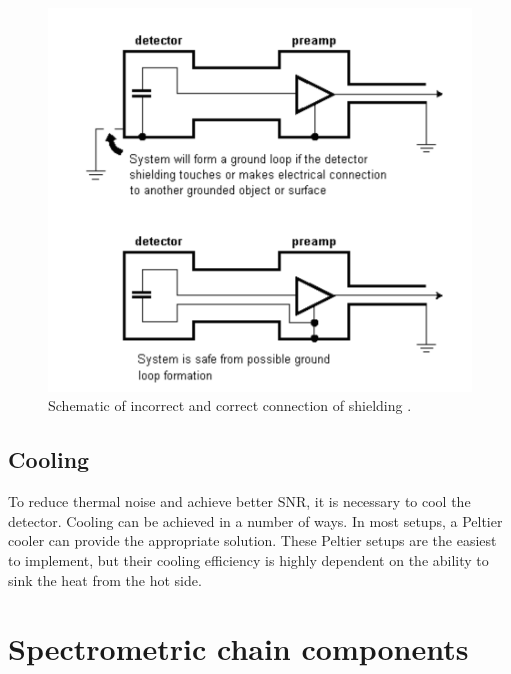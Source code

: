 \begin{figure}[H]
 \centering
 \includegraphics[scale=0.35, angle = 0]{./pictures/shielding.png}
 \caption{Schematic of incorrect and correct connection of shielding \cite{appCSPnote}.}
 \label{shielding}
 
\end{figure}



\subsection{Cooling}
To reduce thermal noise and achieve better SNR, it is necessary to cool the detector. Cooling can be achieved in a number of ways. In most setups, a Peltier cooler can provide the appropriate solution. These Peltier setups are the easiest to implement, but their cooling efficiency is highly dependent on the ability to sink the heat from the hot side.

\section{Spectrometric chain components}
